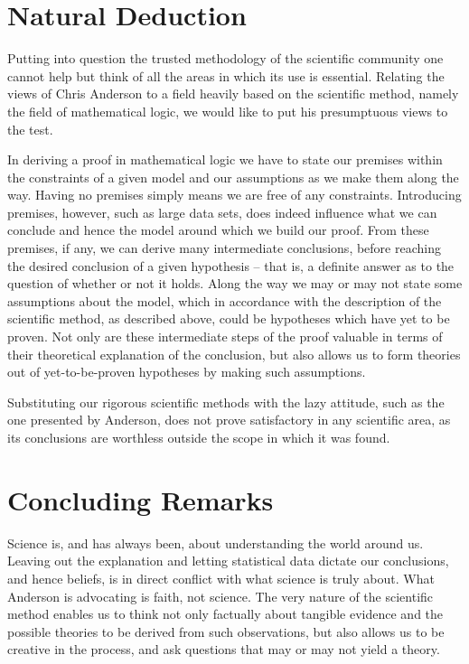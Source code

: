 \documentclass[11pt,a4paper]{article}
\begin{document}
\section{Natural Deduction}
Putting into question the trusted methodology of the scientific community one cannot help but think of all the areas in which its use is essential. Relating the views of Chris Anderson to a field heavily based on the scientific method, namely the field of mathematical logic, we would like to put his presumptuous views to the test.

In deriving a proof in mathematical logic we have to state our premises within the constraints of a given model and our assumptions as we make them along the way. Having no premises simply means we are free of any constraints. Introducing premises, however, such as large data sets, does indeed influence what we can conclude and hence the model around which we build our proof. From these premises, if any, we can derive many intermediate conclusions, before reaching the desired conclusion of a given hypothesis -- that is, a definite answer as to the question of whether or not it holds. Along the way we may or may not state some assumptions about the model, which in accordance with the description of the scientific method, as described above, could be hypotheses which have yet to be proven. Not only are these intermediate steps of the proof valuable in terms of their theoretical explanation of the conclusion, but also allows us to form theories out of yet-to-be-proven hypotheses by making such assumptions.

Substituting our rigorous scientific methods with the lazy attitude, such as the one presented by Anderson, does not prove satisfactory in any scientific area, as its conclusions are worthless outside the scope in which it was found.

\section{Concluding Remarks}
Science is, and has always been, about understanding the world around us. Leaving out the explanation and letting statistical data dictate our conclusions, and hence beliefs, is in direct conflict with what science is truly about. What Anderson is advocating is faith, not science. The very nature of the scientific method enables us to think not only factually about tangible evidence and the possible theories to be derived from such observations, but also allows us to be creative in the process, and ask questions that may or may not yield a theory.
\end{document}
